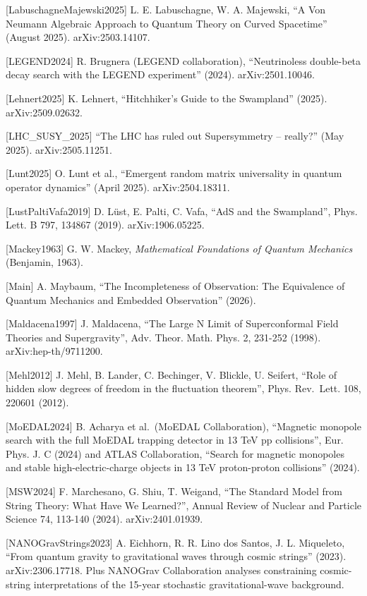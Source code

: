\documentclass[
]{article}
\begin{document}
{[}LabuschagneMajewski2025{]} L. E. Labuschagne, W. A. Majewski, ``A Von
Neumann Algebraic Approach to Quantum Theory on Curved Spacetime''
(August 2025). arXiv:2503.14107.

{[}LEGEND2024{]} R. Brugnera (LEGEND collaboration), ``Neutrinoless
double-beta decay search with the LEGEND experiment'' (2024).
arXiv:2501.10046.

{[}Lehnert2025{]} K. Lehnert, ``Hitchhiker's Guide to the Swampland''
(2025). arXiv:2509.02632.

{[}LHC\_SUSY\_2025{]} ``The LHC has ruled out Supersymmetry -- really?''
(May 2025). arXiv:2505.11251.

{[}Lunt2025{]} O. Lunt et al., ``Emergent random matrix universality in
quantum operator dynamics'' (April 2025). arXiv:2504.18311.

{[}LustPaltiVafa2019{]} D. Lüst, E. Palti, C. Vafa, ``AdS and the
Swampland'', Phys. Lett. B 797, 134867 (2019). arXiv:1906.05225.

{[}Mackey1963{]} G. W. Mackey, \emph{Mathematical Foundations of Quantum
Mechanics} (Benjamin, 1963).

{[}Main{]} A. Maybaum, ``The Incompleteness of Observation: The
Equivalence of Quantum Mechanics and Embedded Observation'' (2026).

{[}Maldacena1997{]} J. Maldacena, ``The Large N Limit of Superconformal
Field Theories and Supergravity'', Adv. Theor. Math. Phys. 2, 231-252
(1998). arXiv:hep-th/9711200.

{[}Mehl2012{]} J. Mehl, B. Lander, C. Bechinger, V. Blickle, U. Seifert,
``Role of hidden slow degrees of freedom in the fluctuation theorem'',
Phys. Rev.~Lett. 108, 220601 (2012).

{[}MoEDAL2024{]} B. Acharya et al.~(MoEDAL Collaboration), ``Magnetic
monopole search with the full MoEDAL trapping detector in 13 TeV pp
collisions'', Eur. Phys. J. C (2024) and ATLAS Collaboration, ``Search
for magnetic monopoles and stable high-electric-charge objects in 13 TeV
proton-proton collisions'' (2024).

{[}MSW2024{]} F. Marchesano, G. Shiu, T. Weigand, ``The Standard Model
from String Theory: What Have We Learned?'', Annual Review of Nuclear
and Particle Science 74, 113-140 (2024). arXiv:2401.01939.

{[}NANOGravStrings2023{]} A. Eichhorn, R. R. Lino dos Santos, J. L.
Miqueleto, ``From quantum gravity to gravitational waves through cosmic
strings'' (2023). arXiv:2306.17718. Plus NANOGrav Collaboration analyses
constraining cosmic-string interpretations of the 15-year stochastic
gravitational-wave background.
\end{document}
